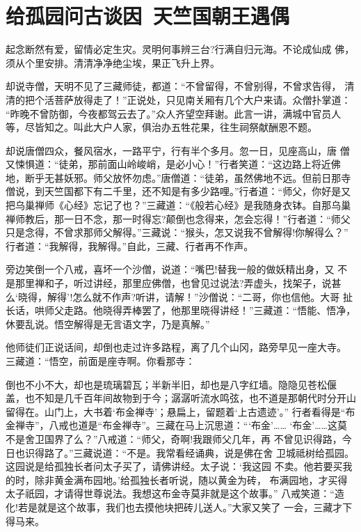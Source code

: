 \chapter{给孤园问古谈因~天竺国朝王遇偶}

起念断然有爱，留情必定生灾。灵明何事辨三台?行满自归元海。不论成仙成
佛，须从个里安排。清清净净绝尘埃，果正飞升上界。

却说寺僧，天明不见了三藏师徒，都道：“不曾留得，不曾别得，不曾求告得，
清清的把个活菩萨放得走了！”正说处，只见南关厢有几个大户来请。众僧扑掌道：
“昨晚不曾防御，今夜都驾云去了。”众人齐望空拜谢。此言一讲，满城中官员人
等，尽皆知之。叫此大户人家，俱治办五牲花果，往生祠祭献酬恩不题。

却说唐僧四众，餐风宿水，一路平宁，行有半个多月。忽一日，见座高山，唐
僧又悚惧道：“徒弟，那前面山岭峻峭，是必小心！”行者笑道：“这边路上将近佛
地，断乎无甚妖邪。师父放怀勿虑。”唐僧道：“徒弟，虽然佛地不远。但前日那寺
僧说，到天竺国都下有二千里，还不知是有多少路哩。”行者道：“师父，你好是又
把乌巢禅师《心经》忘记了也？”三藏道：“《般若心经》是我随身衣钵。自那乌巢
禅师教后，那一日不念，那一时得忘?颠倒也念得来，怎会忘得！”行者道：“师父
只是念得，不曾求那师父解得。”三藏说：“猴头，怎又说我不曾解得!你解得么？”
行者道：“我解得，我解得。”自此，三藏、行者再不作声。

旁边笑倒一个八戒，喜坏一个沙僧，说道：“嘴巴!替我一般的做妖精出身，又
不是那里禅和子，听过讲经，那里应佛僧，也曾见过说法?弄虚头，找架子，说甚
么‘晓得，解得’!怎么就不作声?听讲，请解！”沙僧说：“二哥，你也信他。大哥
扯长话，哄师父走路。他晓得弄棒罢了，他那里晓得讲经！”三藏道：“悟能、悟净，
休要乱说。悟空解得是无言语文字，乃是真解。”

他师徒们正说话间，却倒也走过许多路程，离了几个山冈，路旁早见一座大寺。
三藏道：“悟空，前面是座寺啊。你看那寺：

倒也不小不大，却也是琉璃碧瓦；半新半旧，却也是八字红墙。隐隐见苍松偃
盖，也不知是几千百年间故物到于今；潺潺听流水鸣弦，也不道是那朝代时分开山
留得在。山门上，大书着‘布金禅寺’；悬扁上，留题着‘上古遗迹’。”
行者看得是“布金禅寺”，八戒也道是“布金禅寺”。三藏在马上沉思道：“‘布金’……
‘布金’……这莫不是舍卫国界了么？”八戒道：“师父，奇啊!我跟师父几年，再
不曾见识得路，今日也识得路了。”三藏说道：“不是。我常看经诵典，说是佛在舍
卫城祗树给孤园。这园说是给孤独长者问太子买了，请佛讲经。太子说：‘我这园
不卖。他若要买我的时，除非黄金满布园地。’给孤独长者听说，随以黄金为砖，
布满园地，才买得太子祇园，才请得世尊说法。我想这布金寺莫非就是这个故事。”
八戒笑道：“造化!若是就是这个故事，我们也去摸他块把砖儿送人。”大家又笑了
一会，三藏才下得马来。

